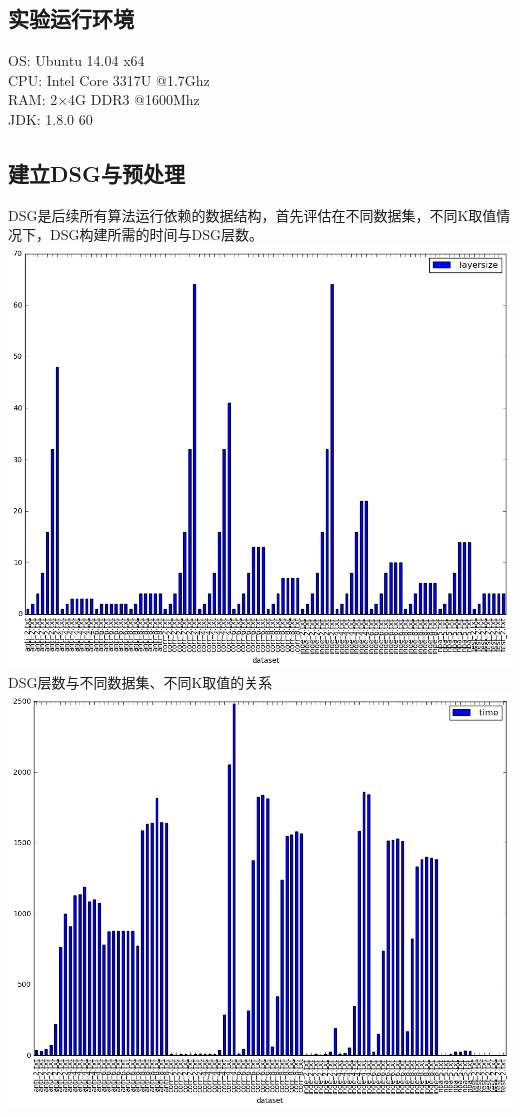 \documentclass{article}
\begin{document}
\begin{CJK}{UTF8}{gbsn}
\subsection{实验运行环境}
OS: Ubuntu 14.04 x64\\
CPU: Intel Core 3317U @1.7Ghz\\
RAM: 2×4G DDR3 @1600Mhz\\
JDK: 1.8.0 60
\subsection{建立DSG与预处理}
DSG是后续所有算法运行依赖的数据结构，首先评估在不同数据集，不同K取值情况下，DSG构建所需的时间与DSG层数。\\

\includegraphics[scale=0.4]{pics/k_layer_size.png}\\
DSG层数与不同数据集、不同K取值的关系\\
\includegraphics[scale=0.4]{pics/k_layer_time.png}

\end{CJK}
\end{document}
